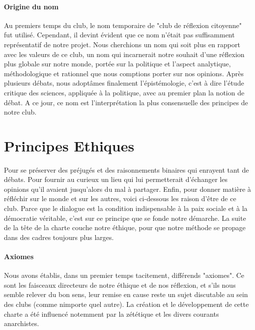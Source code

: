 \documentclass[a4paper,12pt]{article}
\begin{document}
\paragraph{Origine du nom}
Au premiers temps du club, le nom temporaire de "club de réflexion citoyenne" fut utilisé. Cependant, il devint évident que ce nom n'était pas suffisamment représentatif de notre projet. Nous cherchions un nom qui soit plus en rapport avec les valeurs de ce club, un nom qui incarnerait notre souhait d'une réflexion plus globale sur notre monde, portée sur la politique et l'aspect analytique, méthodologique et rationnel que nous comptions porter sur nos opinions. Après plusieurs débats, nous adoptâmes finalement l'épistémologie, c'est à dire l'étude critique des sciences, appliquée à la politique, avec au premier plan la notion de débat. A ce jour, ce nom est l'interprétation la plus consensuelle des principes de notre club.
  
\section{Principes Ethiques}
\paragraph{} 
Pour se préserver des préjugés et des raisonnements binaires qui enrayent tant de débats. Pour fournir au curieux un lieu qui lui permetterait d'échanger les opinions qu'il avaient jusqu'alors du mal à partager. Enfin, pour donner matière à réfléchir sur le monde et sur les autres, voici ci-dessous les raison d'être de ce club. Parce que le dialogue est la condition indispensable à la paix sociale et à la démocratie véritable, c'est sur ce principe que se fonde notre démarche. La suite de la tête de la charte couche notre éthique, pour que notre méthode se propage dans des cadres toujours plus larges.

\paragraph{Axiomes}
Nous avons établis, dans un premier temps tacitement, différends "axiomes". Ce sont les faisceaux directeurs de notre éthique et de nos réflexion, et s'ils nous semble relever du bon sens, leur remise en cause reste un sujet discutable au sein des clubs (comme nimporte quel autre). La création et le développement de cette charte a été influencé notemment par la zététique et les divers courants anarchistes.
\end{document}
